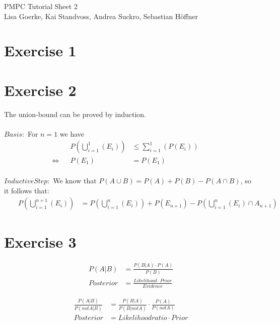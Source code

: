 \documentclass{article}
\begin{document}
\begin{center}
\LARGE PMPC Tutorial Sheet 2\\
\small Lisa Goerke, Kai Standvoss, Andrea Suckro, Sebastian H\"offner
\end{center}
\vspace{0.5cm}
\normalsize

\section*{Exercise 1}

\section*{Exercise 2}
The union-bound can be proved by induction.\\
\\
$Basis:$
For $n=1$ we have
\begin{align}
& & P(\bigcup_{i=1}^{1}(E_i)) & \leq \sum_{i=1}^{1}(P(E_i)) & & \\
\Leftrightarrow & & P(E_1) & = P(E_1) & & 
\end{align}
\\
$Inductive Step:$
We know that $P(A \cup B) = P(A) + P(B) - P(A \cap B)$, so it follows that:
\begin{align}
& & P(\bigcup_{i=1}^{n+1}(E_i)) & = P(\bigcup_{i=1}^{n}(E_i)) + P(E_{n+1}) - P(\bigcup_{i=1}^{n}(E_i) \cap A_{n+1}) & &
\end{align}

\setcounter{equation}{0}
\section*{Exercise 3}

\begin{align}
P(A|B) & = \frac{P(B|A) \cdot P(A)}{P(B)} \\
Posterior & = \frac{Likelihood \cdot Prior}{Evidence}
\end{align}

\begin{align}
\frac{P(A|B)}{P(not A|B)} & = \frac{P(B|A)}{P(B|not A)} \cdot \frac{P(A)}{P(not A)} \\
Posterior & = Likelihoodratio \cdot Prior
\end{align}
\end{document}
